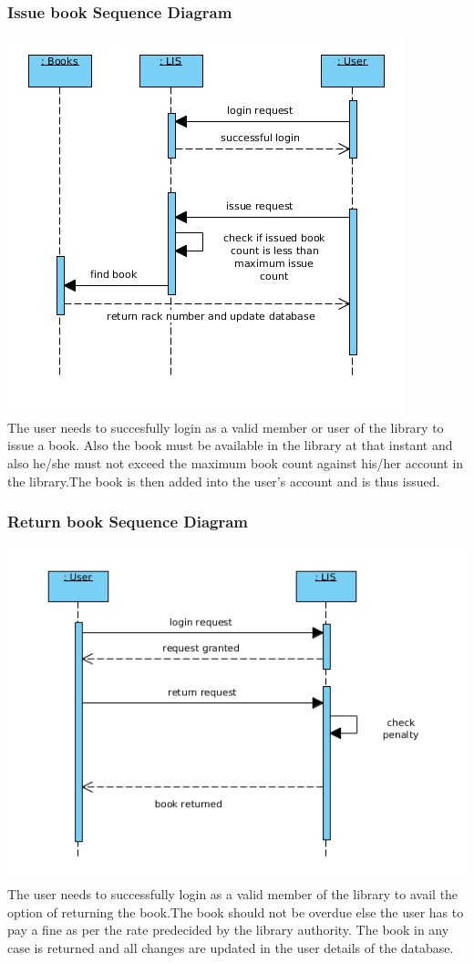\documentclass{article}
\begin{document}
\subsubsection*{Issue book Sequence Diagram}
\includegraphics[scale=0.50]{images/seqDiagIssueBook.png}
\\
The user needs to succesfully login as a valid member or user of the library to issue a book. Also the book must be available in the library at that instant and also he/she must not exceed the maximum book count against his/her account in the library.The book is then added into the user's account and is thus issued.\\

\subsubsection*{Return book Sequence Diagram}
\includegraphics[scale=0.50]{images/seqDiagReturnBook.png}
\\
The user needs to successfully login as a valid member of the library to avail the option of returning the book.The book should not be overdue else the user has to pay a fine as per the rate predecided by the library authority. The book in any case is returned and all changes are updated in the user details of the database.
\\
\end{document}
